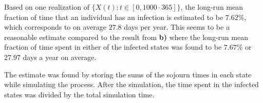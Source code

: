 Based on one realization of $\{X(t): t \in [0,1000\cdot365]\}$, the long-run mean fraction of time that an individual has an infection is estimated to be $7.62\%$, which corresponds to on average $27.8$ days per year. This seems to be a reasonable estimate compared to the result from \textbf{b)} where the long-run mean fraction of time spent in either of the infected states was found to be $7.67\%$ or $27.97$ days a year on average.

The estimate was found by storing the sums of the sojourn times in each state while simulating the process. After the simulation, the time spent in the infected states was divided by the total simulation time. 


